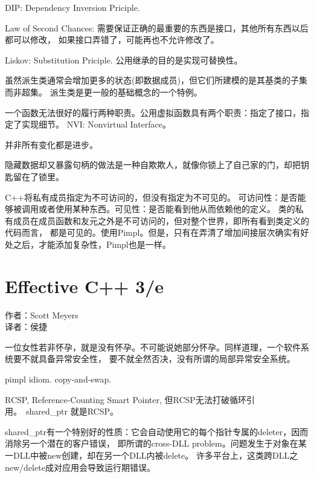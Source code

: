 DIP: Dependency Inversion Priciple.

Law of Second Chances: 需要保证正确的最重要的东西是接口，其他所有东西以后都可以修改，
如果接口弄错了，可能再也不允许修改了。

Liskov: Substitution Priciple. 公用继承的目的是实现可替换性。

虽然派生类通常会增加更多的状态(即数据成员)，但它们所建模的是其基类的子集而非超集。
派生类是更一般的基础概念的一个特例。

一个函数无法很好的履行两种职责。公用虚拟函数具有两个职责：指定了接口，指定了实现细节。
NVI: Nonvirtual Interface。

并非所有变化都是进步。

隐藏数据却又暴露句柄的做法是一种自欺欺人，就像你锁上了自己家的门，却把钥匙留在了锁里。

C++将私有成员指定为不可访问的，但没有指定为不可见的。
可访问性：是否能够被调用或者使用某种东西。可见性：是否能看到他从而依赖他的定义。
类的私有成员在成员函数和友元之外是不可访问的，但对整个世界，即所有看到类定义的代码而言，
都是可见的。使用Pimpl。但是，只有在弄清了增加间接层次确实有好处之后，才能添加复杂性，Pimpl也是一样。

\section{Effective C++ 3/e}
作者：Scott Meyers \\
译者：侯捷

一位女性若非怀孕，就是没有怀孕。不可能说她部分怀孕。同样道理，一个软件系统要不就具备异常安全性，
要不就全然否决，没有所谓的局部异常安全系统。

pimpl idiom. copy-and-swap.

RCSP, Reference-Counting Smart Pointer, 但RCSP无法打破循环引用。\ shared\_ptr 就是RCSP。

shared\_ptr有一个特别好的性质：它会自动使用它的每个指针专属的deleter，因而消除另一个潜在的客户错误，
即所谓的cross-DLL problem。问题发生于对象在某一DLL中被new创建，却在另一个DLL内被delete。
许多平台上，这类跨DLL之new/delete成对应用会导致运行期错误。


